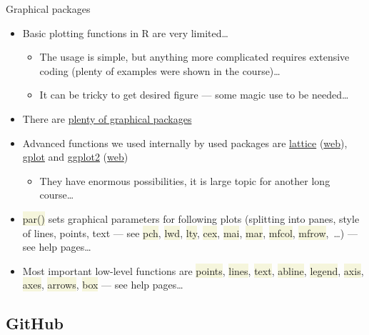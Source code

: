 \documentclass[compress, ucs, xelatex, 11pt, xcolor=svgnames, aspectratio=169,
	hyperref={
		bookmarks=true,
		unicode=true,
		colorlinks=true,
		pdftitle={Molecular data in R},
		plainpages=false,
		pdfauthor={Vojtech Zeisek},
		pdfsubject={Course about phylogeny and evolution in R},
		pdfcreator={XeLaTeX},
		pdfkeywords={R, evolution, phylogeny, molecular data},
		linkcolor=Crimson, %
		anchorcolor=Magenta, %
		citecolor=Magenta, %
		filecolor=Magenta, %
		menucolor=Magenta, %
		urlcolor=DodgerBlue, %
		pdftex},
	url={hyphens, lowtilde} %
	]{beamer}
\renewcommand{\texttt}[1]{\colorbox{Beige}{{\ttfamily #1}}}
\begin{document}
\begin{frame}{Graphical packages}
	\begin{itemize}
		\item Basic plotting functions in R are very limited\ldots
		\begin{itemize}
			\item The usage is simple, but anything more complicated requires extensive coding (plenty of examples were shown in the course)\ldots
			\item It can be tricky to get desired figure --- some magic use to be needed\ldots
		\end{itemize}
		\item There are \href{https://CRAN.R-project.org/web/views/Graphics.html}{plenty of graphical packages}
		\item Advanced functions we used internally by used packages are \href{https://CRAN.R-project.org/package=lattice}{lattice} (\href{https://lattice.r-forge.r-project.org/}{web}), \href{https://CRAN.R-project.org/package=gplots}{gplot} and \href{https://CRAN.R-project.org/package=ggplot2}{ggplot2} (\href{https://ggplot2.tidyverse.org/}{web})
		\begin{itemize}
			\item They have enormous possibilities, it is large topic for another long course\ldots
		\end{itemize}
		\item \texttt{par()} sets graphical parameters for following plots (splitting into panes, style of lines, points, text --- see \texttt{pch}, \texttt{lwd}, \texttt{lty}, \texttt{cex}, \texttt{mai}, \texttt{mar}, \texttt{mfcol}, \texttt{mfrow},~\ldots) --- see help pages\ldots
		\item Most important low-level functions are \texttt{points}, \texttt{lines}, \texttt{text}, \texttt{abline}, \texttt{legend}, \texttt{axis}, \texttt{axes}, \texttt{arrows}, \texttt{box} --- see help pages\ldots
	\end{itemize}
\end{frame}

\subsection{GitHub}
\end{document}
